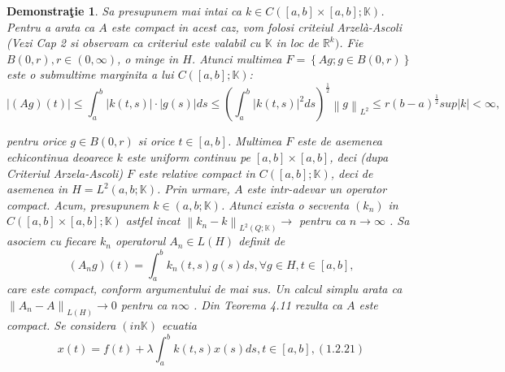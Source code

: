 \documentclass[a4paper,12pt,oneside]{report}
\newtheorem{demonstration}{Demonstra\c tie}
\begin{document}
	\begin{demonstration}
		Sa presupunem mai intai ca \(k \in C\left ( \left [ a,b \right ]  \times \left [ a,b \right ]; \mathbb{K}\right )\). Pentru a arata ca \(A\) este compact in acest caz, vom folosi criteiul Arzelà-Ascoli (Vezi Cap 2 si observam ca criteriul este valabil cu \(\mathbb{K}\) in loc de \(\mathbb{R}^{k})\). Fie \(B\left ( 0,r \right ), r\in \left ( 0,\infty  \right )\), o minge in \(H\). Atunci multimea \(F = \left \{ Ag; g\in B\left ( 0,r \right ) \right \}\) este o submultime marginita a lui \(C\left ( \left [ a,b \right ];\mathbb{K} \right )\): 
		\begin{displaymath}
			\left | \left ( Ag \right )\left ( t \right ) \right |\leq \int_{a}^{b}\left | k\left ( t,s \right ) \right |\cdot \left | g\left ( s \right ) \right |ds \leq \left ( \int_{a}^{b} \left | k\left ( t,s \right ) \right |^{2}ds \right )^{\frac{1}{2}}\left \| g \right \|_{L^{2}}\leq r\left ( b-a \right )^{\frac{1}{2}}sup\left | k \right |< \infty, 
		\end{displaymath}
										
		pentru orice \(g \in B\left ( 0,r \right )\) si orice \(t\in \left [ a,b \right ]\). Multimea \(F\) este de asemenea echicontinua deoarece \(k\) este uniform continuu pe \(\left [ a,b \right ] \times \left [ a,b \right ]\), deci (dupa Criteriul Arzela-Ascoli) \(F\) este relative compact in \(C\left ( \left [ a,b \right ];\mathbb{K} \right )\), deci de asemenea in \(H = L^{2}\left ( a,b;\mathbb{K} \right )\). Prin urmare, \(A\) este intr-adevar un operator compact. Acum, presupunem \(k\in \left ( a,b;\mathbb{K} \right )\). Atunci exista o secventa \(\left (k_{n}  \right )\) in \(C\left ( \left [ a,b \right ] \times  \left [ a,b \right ];\mathbb{K} \right )\) astfel incat \(\left \| k_{n} -k \right \|_{L^{2}\left ( Q;\mathbb{K} \right )}\rightarrow\)  pentru ca \(n\rightarrow \infty\) . Sa asociem cu fiecare \(k_{n}\) operatorul \(A_{n} \in L\left ( H \right )\) definit de 
		\begin{displaymath}
			\left (A_{n}g \right )\left ( t \right ) = \int_{a}^{b}k_{n}\left ( t,s \right )g\left ( s \right )ds, \forall g\in H, t\in \left [ a,b \right ],
		\end{displaymath}
		care este compact, conform argumentului de mai sus. Un calcul simplu arata ca \(\left \| A_{n}-A \right \|_{L\left ( H \right )}\rightarrow 0\) pentru ca  \(n\infty\)  . Din Teorema 4.11 rezulta ca \(A\) este compact. 
		Se considera \((in \mathbb{K})\) ecuatia 
		\begin{displaymath}
			x\left ( t \right ) = f\left ( t \right ) + \lambda \int_{a}^{b}k\left ( t,s \right )x\left ( s \right )ds, t\in \left [ a,b \right ], (1.2.21)
		\end{displaymath}
										

\end{demonstration}
\end{document}

